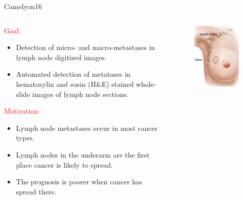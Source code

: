 \documentclass{beamer}
\begin{document}
\begin{frame}{Camelyon16}

\begin{columns}[T] %
\begin{column}{.50\textwidth}
\begin{small}
\textcolor{red}{Goal:}
\begin{itemize}
\item Detection of micro- and macro-metastases in lymph node digitized images.
\item Automated detection of metatases in hematoxylin and eosin (H\&E) stained whole-slide images of lymph node sections.
\end{itemize}
\textcolor{red}{Motivation:}
\begin{itemize}
\item Lymph node metastases occur in most cancer types.
\item Lymph nodes in the underarm are the first place cancer is likely to spread.
\item The prognosis is poorer when cancer has spread there.
\end{itemize}
\end{small}
\end{column}%
\hfill%
\begin{column}{.50\textwidth}
\begin{figure}[!ht]
\centering
\includegraphics[width=\textwidth]{Booby.png}
\label{booby}
\end{figure}
\end{column}%
\end{columns}

\end{frame}
\end{document}
